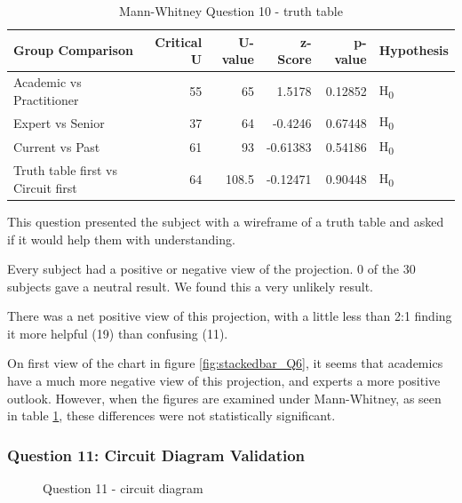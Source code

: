\begin{table}[H]
    \begin{center}
        \begin{tabular}{ |l ||r |r |r | r|l | } 
            \hline
            Group Comparison                   & Critical U & U-value & z-Score  & p-value & Hypothesis         \\
            \hline
            \hline
            Academic vs Practitioner           &  55        & 65      & 1.5178   & 0.12852 & H\textsubscript{0} \\ 
            \hline
            Expert vs Senior                   &  37        & 64      & -0.4246  & 0.67448 & H\textsubscript{0} \\ 
            \hline
            Current vs Past                    &  61        & 93      & -0.61383 & 0.54186 & H\textsubscript{0} \\ 
            \hline
            Truth table first vs Circuit first &  64        & 108.5   & -0.12471 & 0.90448 & H\textsubscript{0} \\ 
            \hline
        \end{tabular}
    \end{center}
    \caption{Mann-Whitney Question 10 - truth table}
    \label{table:mannwhitneyQ6}
\end{table}

This question presented the subject with a wireframe of a truth table and asked if it would help them with understanding.

Every subject had a positive or negative view of the projection.
0 of the 30 subjects gave a neutral result.
We found this a very unlikely result.

There was a net positive view of this projection, with a little less than 2:1 finding it more helpful (19) than confusing (11).

On first view of the chart in figure \ref{fig:stackedbar_Q6}, it seems that academics have a much more negative view of this projection, and experts a more positive outlook.
However, when the figures are examined under Mann-Whitney, as seen in table \ref{table:mannwhitneyQ6}, these differences were not statistically significant.

\subsubsection{Question 11: Circuit Diagram Validation}

\begin{figure}[H]
    \centering
    \caption{Question 11 - circuit diagram}
    \label{fig:stackedbar_Q7}
\end{figure}

